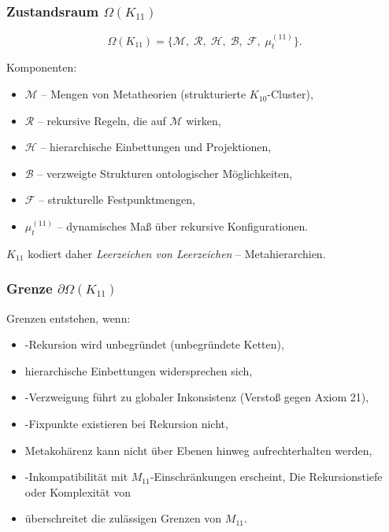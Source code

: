 \subsubsection{Zustandsraum $\Omega(K_{11})$}

\[
\Omega(K_{11})=
\{
\mathcal{M},\;
\mathcal{R},\;
\mathcal{H},\;
\mathcal{B},\;
\mathcal{F},\;
\mu^{(11)}_t
\}.
\]

Komponenten:
\begin{itemize}
    \item $\mathcal{M}$ – Mengen von Metatheorien (strukturierte $K_{10}$-Cluster),
    \item $\mathcal{R}$ – rekursive Regeln, die auf $\mathcal{M}$ wirken,
    \item $\mathcal{H}$ – hierarchische Einbettungen und Projektionen,
    \item $\mathcal{B}$ – verzweigte Strukturen ontologischer Möglichkeiten,
    \item $\mathcal{F}$ – strukturelle Festpunktmengen,
    \item $\mu^{(11)}_t$ – dynamisches Maß über rekursive Konfigurationen.
\end{itemize}

$K_{11}$ kodiert daher \emph{Leerzeichen von Leerzeichen} – Metahierarchien.

\subsubsection{Grenze $\partial\Omega(K_{11})$}

Grenzen entstehen, wenn:
\begin{itemize}
    \item-Rekursion wird unbegründet (unbegründete Ketten),
    \item hierarchische Einbettungen widersprechen sich,
    \item-Verzweigung führt zu globaler Inkonsistenz (Verstoß gegen Axiom 21),
    \item-Fixpunkte existieren bei Rekursion nicht,
    \item Metakohärenz kann nicht über Ebenen hinweg aufrechterhalten werden,
    \item-Inkompatibilität mit $M_{11}$-Einschränkungen erscheint,
    Die Rekursionstiefe oder Komplexität von \item überschreitet die zulässigen Grenzen von $M_{11}$.
\end{itemize}

